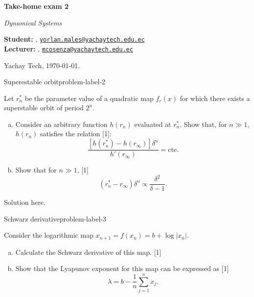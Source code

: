 





\textsf{\LARGE{\textbf{Take-home exam 2}}}

\normalsize{\textit{Dynamical Systems}}

\vspace{1ex}

\textsf{\textbf{Student:}} , 
\href{mailto:yorlan.males@yachaytech.edu.ec}{\texttt{yorlan.males@yachaytech.edu.ec}}\\
\textsf{\textbf{Lecturer:}} , 
\href{mcosenza@yachaytech.edu.ec}{\texttt{mcosenza@yachaytech.edu.ec}}

Yachay Tech, \today.

\vspace{2ex}



\begin{problem}{Superestable orbit}{problem-label-2}

Let $r_n^*$ be the parameter value of a quadratic map $f_r(x)$ for which there
exists a superstable orbit of period $2^n$.

\begin{enumerate}[(a)]
    \item Consider an arbitrary function $h(r_n)$ evaluated at $r_n^*$. Show that, 
    for $n \gg 1$, $h(r_n)$ satisfies the relation [1]:
    \[
        \frac{[h(r_n^*)-h(r_{\infty})]\delta^n}{h'(r_{\infty})} = \text{cte.}
    \]
    \item Show that for $ n \gg 1$, [1]
    \[
        (r_n^*-r_{\infty})\delta^n \propto \frac{\delta^2}{\delta -1}.
    \]
\end{enumerate}
\end{problem}

Solution here.

\begin{problem}{Schwarz derivative}{problem-label-3}

Consider the logarithmic map $x_{n+1}=f(x_n)=b+\log|x_n|$.

\begin{enumerate}[(a)]
    \item Calculate the Schwarz derivative of this map. [1]
    \item Show that the Lyapunov exponent for this map can be expressed as [1]
    \[
        \lambda = b - \frac{1}{n}\sum_{j=1}^{n}x_j.
    \] 
\end{enumerate}
\end{problem}


